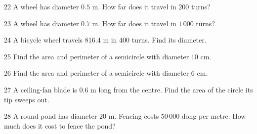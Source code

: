 \gap
\begin{probbox}{22}{\relax}
A wheel has diameter $0.5$ m. How far does it travel in $200$ turns?
\end{probbox}
\gap
\begin{probbox}{23}{\relax}
A wheel has diameter $0.7$ m. How far does it travel in $1\,000$ turns?
\end{probbox}
\gap
\begin{probbox}{24}{\relax}
A bicycle wheel travels $816.4$ m in $400$ turns. Find its diameter.
\end{probbox}
\gap
\begin{probbox}{25}{\relax}
Find the area and perimeter of a semicircle with diameter $10$ cm.
\end{probbox}
\gap
\begin{probbox}{26}{\relax}
Find the area and perimeter of a semicircle with diameter $6$ cm.
\end{probbox}
\gap
\begin{probbox}{27}{\relax}
A ceiling-fan blade is $0.6$ m long from the centre. Find the area of the circle its tip sweeps out.
\end{probbox}
\gap
\begin{probbox}{28}{\relax}
A round pond has diameter $20$ m. Fencing costs $50\,000$ dong per metre. How much does it cost to fence the pond?
\end{probbox}

